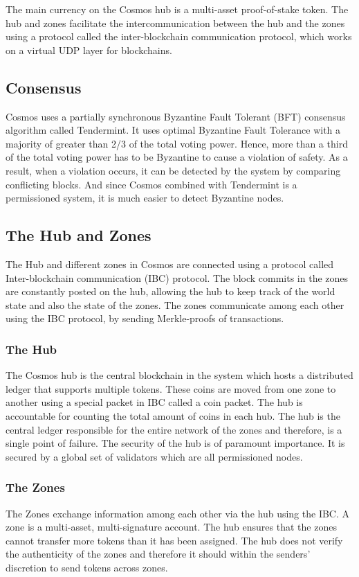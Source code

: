 \documentclass[a4paper,twoside,phd]{BYUPhys}
\begin{document}
The main currency on the Cosmos hub is a multi-asset proof-of-stake token. The hub and zones facilitate the intercommunication between the hub and the zones using a protocol called the inter-blockchain communication protocol, which works on a virtual UDP layer for blockchains.\cite{}

\subsection{Consensus}
Cosmos uses a partially synchronous Byzantine Fault Tolerant (BFT) consensus algorithm called Tendermint. It uses optimal Byzantine Fault Tolerance with a majority of greater than 2/3 of the total voting power. Hence, more than a third of the total voting power has to be Byzantine to cause a violation of safety\cite{}. As a result, when a violation occurs, it can be detected by the system by comparing conflicting blocks. And since Cosmos combined with Tendermint is a permissioned system, it is much easier to detect Byzantine nodes.

\subsection{The Hub and Zones}
The Hub and different zones in Cosmos are connected using a protocol called Inter-blockchain communication (IBC) protocol. The block commits in the zones are constantly posted on the hub, allowing the hub to keep track of the world state and also the state of the zones. The zones communicate among each other using the IBC protocol, by sending Merkle-proofs of transactions. \cite{}
\subsubsection{The Hub}
The Cosmos hub is the central blockchain in the system which hosts a distributed ledger that supports multiple tokens\cite{}. These coins are moved from one zone to another using a special packet in IBC called a coin packet\cite{}. The hub is accountable for counting the total amount of coins in each hub. The hub is the central ledger responsible for the entire network of the zones and therefore, is a single point of failure. The security of the hub is of paramount importance. It is secured by a global set of validators which are all permissioned nodes\cite{}.
\subsubsection{The Zones}
The Zones exchange information among each other via the hub using the IBC. A zone is a multi-asset, multi-signature account\cite{}. The hub ensures that the zones cannot transfer more tokens than it has been assigned. The hub does not verify the authenticity of the zones and therefore it should within the senders' discretion to send tokens across zones. 
\end{document}
